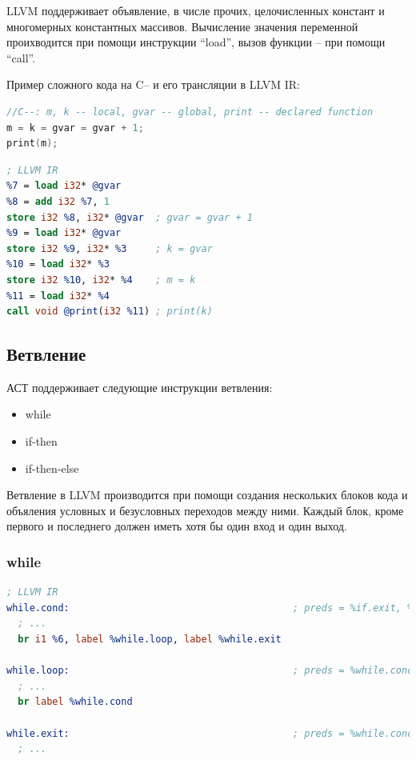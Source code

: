 \documentclass[a4paper,12pt]{report}
\numberwithin{equation}{section}
\begin{document}
LLVM поддерживает объявление, в числе прочих, целочисленных констант и многомерных константных массивов. Вычисление значения переменной проихводится при помощи инструкции ``load'', вызов функции -- при помощи ``call''.


Пример сложного кода на C-- и его трансляции в LLVM IR:
\begin{lstlisting}[language=C]
//C--: m, k -- local, gvar -- global, print -- declared function
m = k = gvar = gvar + 1;
print(m);
\end{lstlisting}

\begin{lstlisting}[language=llvm]
; LLVM IR
%7 = load i32* @gvar
%8 = add i32 %7, 1
store i32 %8, i32* @gvar  ; gvar = gvar + 1
%9 = load i32* @gvar
store i32 %9, i32* %3     ; k = gvar
%10 = load i32* %3
store i32 %10, i32* %4    ; m = k
%11 = load i32* %4
call void @print(i32 %11) ; print(k)
\end{lstlisting}

\subsection{Ветвление}
АСТ поддерживает следующие инструкции ветвления:
\begin{itemize}
  \item while
  \item if-then
  \item if-then-else
\end{itemize}
Ветвление в LLVM производится при помощи создания нескольких блоков кода и объяления условных и безусловных переходов между ними.
Каждый блок, кроме первого и последнего должен иметь хотя бы один вход и один выход.

\subsubsection*{while}
\begin{lstlisting}[language=llvm]
; LLVM IR
while.cond:                                       ; preds = %if.exit, %entry
  ; ...
  br i1 %6, label %while.loop, label %while.exit

while.loop:                                       ; preds = %while.cond
  ; ...
  br label %while.cond

while.exit:                                       ; preds = %while.cond
  ; ...
\end{lstlisting}
\end{document}
